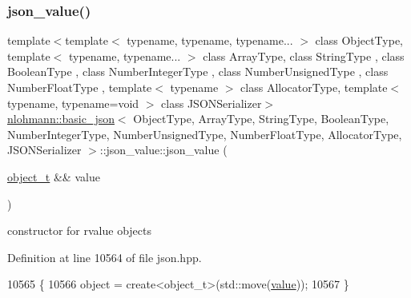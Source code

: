 \subsubsection{\texorpdfstring{json\+\_\+value()}{json\_value()}\hspace{0.1cm}{\footnotesize\ttfamily [10/12]}}
{\footnotesize\ttfamily template$<$template$<$ typename, typename, typename... $>$ class Object\+Type, template$<$ typename, typename... $>$ class Array\+Type, class String\+Type , class Boolean\+Type , class Number\+Integer\+Type , class Number\+Unsigned\+Type , class Number\+Float\+Type , template$<$ typename $>$ class Allocator\+Type, template$<$ typename, typename=void $>$ class J\+S\+O\+N\+Serializer$>$ \\
\hyperlink{classnlohmann_1_1basic__json}{nlohmann\+::basic\+\_\+json}$<$ Object\+Type, Array\+Type, String\+Type, Boolean\+Type, Number\+Integer\+Type, Number\+Unsigned\+Type, Number\+Float\+Type, Allocator\+Type, J\+S\+O\+N\+Serializer $>$\+::json\+\_\+value\+::json\+\_\+value (\begin{DoxyParamCaption}\item[{\hyperlink{classnlohmann_1_1basic__json_a5e48a7893520e1314bf0c9723e26ea2a}{object\+\_\+t} \&\&}]{value }\end{DoxyParamCaption})\hspace{0.3cm}{\ttfamily [inline]}}



constructor for rvalue objects 



Definition at line 10564 of file json.\+hpp.


\begin{DoxyCode}
10565         \{
10566             \textcolor{keywordtype}{object} = create<object\_t>(std::move(\hyperlink{classnlohmann_1_1basic__json_adcf8ca5079f5db993820bf50036bf45d}{value}));
10567         \}
\end{DoxyCode}
\mbox{\label{unionnlohmann_1_1basic__json_1_1json__value_a23a4858ed8fc824e5544edaf8a01a974}} 

